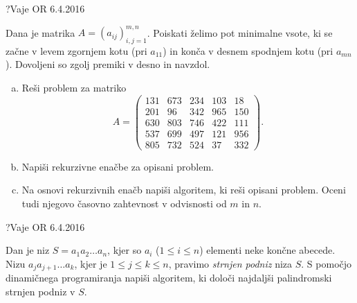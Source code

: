 \begin{naloga}{?}{Vaje OR 6.4.2016}
\begin{vprasanje}
Dana je matrika $A = (a_{ij})_{i,j=1}^{m,n}$.
Poiskati želimo pot minimalne vsote,
ki se začne v levem zgornjem kotu (pri $a_{11}$)
in konča v desnem spodnjem kotu (pri $a_{mn}$).
Dovoljeni so zgolj premiki v desno in navzdol.
\begin{enumerate}[(a)]
\item Reši problem za matriko
$$
A = \begin{pmatrix}
131 & 673 & 234 & 103 &  18 \\
201 &  96 & 342 & 965 & 150 \\
630 & 803 & 746 & 422 & 111 \\
537 & 699 & 497 & 121 & 956 \\
805 & 732 & 524 &  37 & 332
\end{pmatrix} .
$$
\item Napiši rekurzivne enačbe za opisani problem.
\item Na osnovi rekurzivnih enačb napiši algoritem, ki reši opisani problem.
Oceni tudi njegovo časovno zahtevnost v odvisnosti od $m$ in $n$.
\end{enumerate}

\end{vprasanje}
\begin{odgovor}
\end{odgovor}
\end{naloga}


\begin{naloga}{?}{Vaje OR 6.4.2016}
\begin{vprasanje}
Dan je niz $S = a_1 a_2 \dots a_n$,
kjer so $a_i$ ($1 \le i \le n$) elementi neke končne abecede.
Nizu $a_j a_{j+1} \dots a_k$, kjer je $1 \le j \le k \le n$,
pravimo {\em strnjen podniz} niza $S$.
S pomočjo dinamičnega programiranja napiši algoritem,
ki določi najdaljši palindromski strnjen podniz v $S$.

\end{vprasanje}
\begin{odgovor}
\end{odgovor}
\end{naloga}


